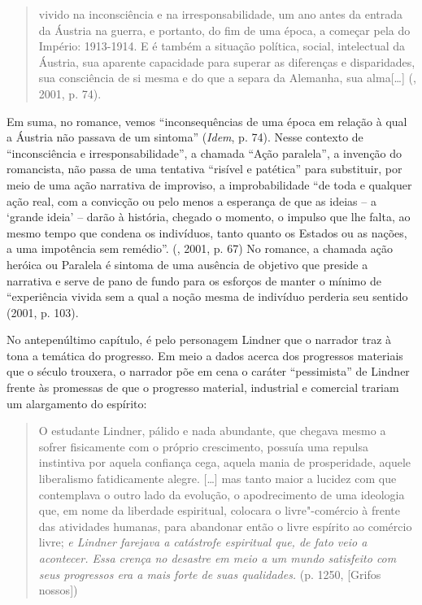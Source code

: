 \begin{quote}
vivido na inconsciência e na irresponsabilidade, um ano antes da entrada
da Áustria na guerra, e portanto, do fim de uma época, a começar pela do
Império: 1913-1914. E é também a situação política, social, intelectual
da Áustria, sua aparente capacidade para superar as diferenças e
disparidades, sua consciência de si mesma e do que a separa da Alemanha,
sua alma[\ldots{}] (, 2001, p. 74).
\end{quote}

Em suma, no romance, vemos ``inconsequências de uma época em relação à
qual a Áustria não passava de um sintoma'' (\emph{Idem}, p. 74). Nesse
contexto de ``inconsciência e irresponsabilidade'', a chamada ``Ação
paralela'', a invenção do romancista, não passa de uma tentativa
``risível e patética'' para substituir, por meio de uma ação narrativa
de improviso, a improbabilidade ``de toda e qualquer ação real, com a
convicção ou pelo menos a esperança de que as ideias -- a `grande ideia'
-- darão à história, chegado o momento, o impulso que lhe falta, ao
mesmo tempo que condena os indivíduos, tanto quanto os Estados ou as
nações, a uma impotência sem remédio''. (, 2001, p. 67) No
romance, a chamada ação heróica ou Paralela é sintoma de uma ausência de
objetivo que preside a narrativa e serve de pano de fundo para os
esforços de manter o mínimo de ``experiência vivida sem a qual a noção
mesma de indivíduo perderia seu sentido (2001, p. 103).

No antepenúltimo capítulo, é pelo personagem Lindner que o narrador traz
à tona a temática do progresso. Em meio a dados acerca dos progressos
materiais que o século  trouxera, o narrador põe em cena o caráter
``pessimista'' de Lindner frente às promessas de que o progresso
material, industrial e comercial trariam um alargamento do espírito:

\begin{quote}
O estudante Lindner, pálido e nada abundante, que chegava mesmo a sofrer
fisicamente com o próprio crescimento, possuía uma repulsa instintiva
por aquela confiança cega, aquela mania de prosperidade, aquele
liberalismo fatidicamente alegre. [\ldots{}] mas tanto maior a
lucidez com que contemplava o outro lado da evolução, o apodrecimento de
uma ideologia que, em nome da liberdade espiritual, colocara o
livre"-comércio à frente das atividades humanas, para abandonar então o
livre espírito ao comércio livre; \emph{e Lindner farejava a catástrofe
espiritual que, de fato veio a acontecer. Essa crença no desastre em
meio a um mundo satisfeito com seus progressos era a mais forte de suas
qualidades.} (p. 1250, [Grifos nossos])
\end{quote}

